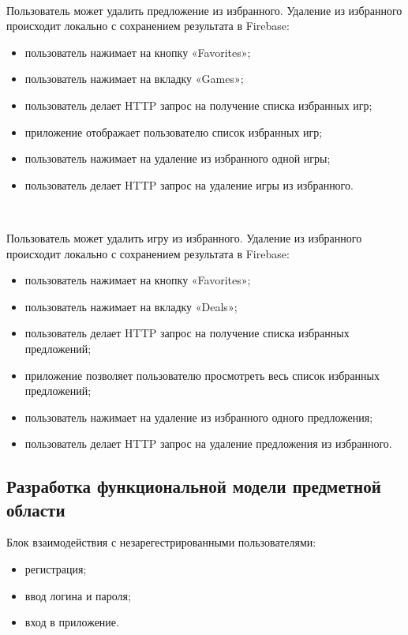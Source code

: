 ~\par
Пользователь может удалить предложение из избранного. Удаление из избранного происходит локально с сохранением результата в Firebase:

\begin{itemize}
  \item пользователь нажимает на кнопку «Favorites»;
  \item пользователь нажимает на вкладку «Games»;
  \item пользователь делает HTTP запрос на получение списка избранных игр;
  \item приложение отображает пользователю список избранных игр;
  \item пользователь нажимает на удаление из избранного одной игры;
  \item пользователь делает HTTP запрос на удаление игры из избранного.
\end{itemize}



~\par
Пользователь может удалить игру из избранного. Удаление из избранного происходит локально с сохранением результата в Firebase:

\begin{itemize}
  \item пользователь нажимает на кнопку «Favorites»;
  \item пользователь нажимает на вкладку «Deals»;
  \item пользователь делает HTTP запрос на получение списка избранных предложений;
  \item приложение позволяет пользователю просмотреть весь список избранных предложений;
  \item пользователь нажимает на удаление из избранного одного предложения;
  \item пользователь делает HTTP запрос на удаление предложения из избранного.
\end{itemize}

\subsection{Разработка функциональной модели предметной области}

Блок взаимодействия с незарегестрированными пользователями:

\begin{itemize}
    \item регистрация;
    \item ввод логина и пароля;
    \item вход в приложение.
\end{itemize}

